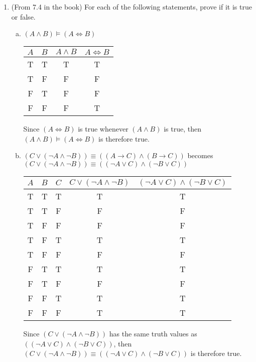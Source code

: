 \documentclass[10pt,draftclsnofoot,onecolumn]{IEEEtran}
\begin{document}
\begin{enumerate}
  \item (From 7.4 in the book) For each of the following statements, prove if it is true or false.
  \begin{enumerate}[a)]
    \item \( (A \land B) \models (A \iff B) \) \\

    \begin{tabular}{|c|c|c|c|}
      \hline
      \( A \) & \( B \) & \( A \land B \) & \( A \iff B \) \\
      \hline
      T & T & T & T \\
      T & F & F & F \\
      F & T & F & F \\
      F & F & F & T \\
      \hline
    \end{tabular} \medskip %

    Since \( (A \iff B) \) is true whenever \( (A \land B) \) is true, then \( (A \land B) \models (A \iff B) \) is therefore true. \\

    \item \( (C \lor (\neg A \land \neg B)) \equiv ((A \rightarrow C) \land (B \rightarrow C)) \) becomes \( (C \lor (\neg A \land \neg B)) \equiv ((\neg A \lor C) \land (\neg B \lor C)) \) \\

    \begin{tabular}{|c|c|c|c|c|}
      \hline
      \( A \) & \( B \) & \( C \) & \( C \lor (\neg A \land \neg B) \) & \( (\neg A \lor C) \land (\neg B \lor C) \) \\
      \hline
      T & T & T & T & T \\
      T & T & F & F & F \\
      T & F & F & F & F \\
      T & F & T & T & T \\
      T & F & F & F & F \\
      F & T & T & T & T \\
      F & T & F & F & F \\
      F & F & T & T & T \\
      F & F & F & T & T \\
      \hline
    \end{tabular} \medskip %

    Since \( (C \lor (\neg A \land \neg B)) \) has the same truth values as \( ((\neg A \lor C) \land (\neg B \lor C)) \), then \( (C \lor (\neg A \land \neg B)) \equiv ((\neg A \lor C) \land (\neg B \lor C)) \) is therefore true. \\


\end{enumerate}
\end{enumerate}
\end{document}
